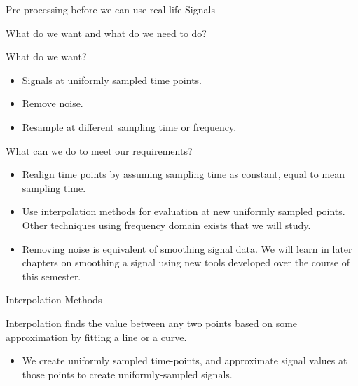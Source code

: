 \documentclass[aspectratio=169,xcolor=dvipsnames,svgnames,x11names,fleqn]{beamer}
\begin{document}
\begin{frame}{Pre-processing before we can use real-life Signals}

What do we want and what do we need to do?

What do we want?
\begin{itemize}

\item Signals at uniformly sampled time points.
\item Remove noise.
\item Resample at different sampling time or frequency.
\end{itemize}

What can we do to meet our requirements?

\begin{itemize}
\item Realign time points by assuming sampling time as constant, equal to mean sampling time.

\item Use interpolation methods for evaluation at new uniformly sampled points. Other techniques using frequency domain exists that we will study.

\item Removing noise is equivalent of smoothing signal data. We will learn in later chapters on smoothing a signal using new tools developed over the course of this semester.

\end{itemize}


\end{frame}


\begin{frame}{Interpolation Methods}


\begin{talert}{}
Interpolation finds the value between any two points based on some approximation by fitting a line or a curve.
\end{talert}

\begin{itemize}
\item We create uniformly sampled time-points, and approximate signal values at those points to create uniformly-sampled signals.
\end{itemize}


\end{frame}
\end{document}
